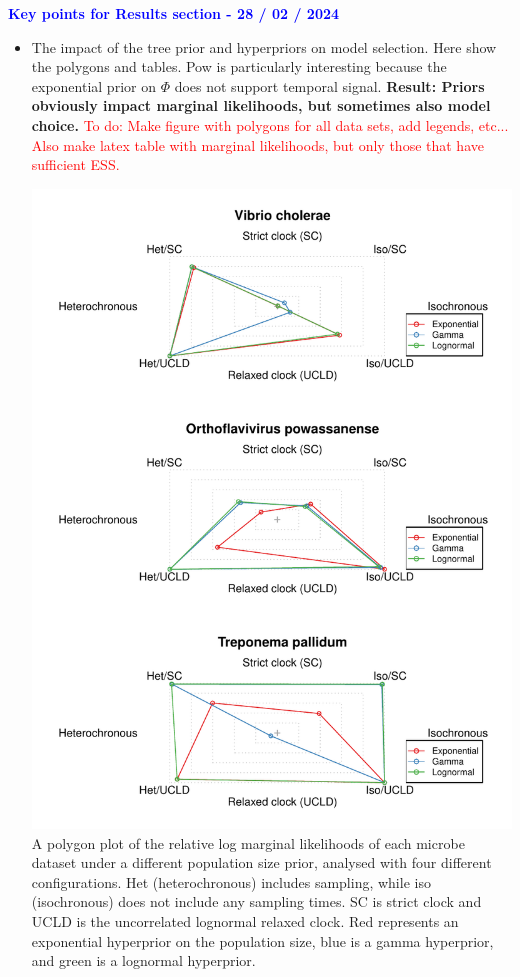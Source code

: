 \documentclass[11pt]{article}
\begin{document}
\textbf{\textcolor{blue}{Key points for Results section - 28 / 02 / 2024}}
\begin{itemize}
	\item The impact of the tree prior and hyperpriors on model selection. Here show the polygons and tables. Pow is particularly interesting because the exponential prior on $\Phi$ does not support temporal signal. \textbf{Result: Priors obviously impact marginal   likelihoods, but sometimes also model choice.}
        \subitem \textcolor{red}{To do: Make figure with polygons for all data sets, add legends, etc... Also make latex table with marginal likelihoods, but only those that have sufficient ESS.}
        \begin{center}
            \includegraphics[width=14cm]{sandbox_figures/polygon_plot.pdf}\newline
            A polygon plot of the relative log marginal likelihoods of each microbe dataset under a different population size prior, analysed with four different configurations. Het (heterochronous) includes sampling, while iso (isochronous) does not include any sampling times. SC is strict clock and UCLD is the uncorrelated lognormal relaxed clock. Red represents an exponential hyperprior on the population size, blue is a gamma hyperprior, and green is a lognormal hyperprior.

\end{center}
\end{itemize}
\end{document}
